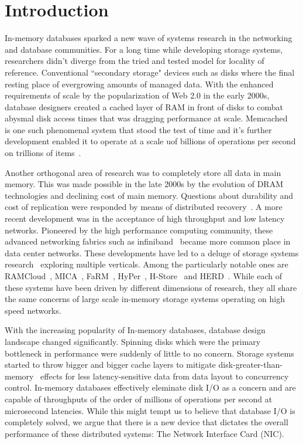 
\chapter{Introduction}
In-memory databases sparked a new wave of systems research in the 
networking and database communities. For a long time while developing storage
systems, researchers didn't diverge from the  tried and tested model for
locality of reference. Conventional ``secondary storage" devices
such as disks where the final resting place of evergrowing amounts of managed data. With the 
enhanced requirements of scale by the popularization of Web 2.0 in the early 2000s, 
database designers created a cached layer of RAM in front of disks
to combat abysmal disk access times that was dragging performance at scale. Memcached~\cite{memcached-orig}
is one such phenomenal system that stood the test of time and it's further development
enabled it to operate at a scale uof billions of operations per second on trillions of items~\cite{nishtala2013scaling}.

Another orthogonal area of research was to completely store all data in main memory.
This was made possible in the late 2000s by the evolution of DRAM technologies and declining cost of main memory.
Questions about durability and cost of replication 
were responded by means of distributed recovery~\cite{ongaro2011fast}. 
A more recent development was in the acceptance of high throughput and low latency networks. 
Pioneered by the high performance computing community, these advanced networking fabrics 
such as infiniband~\cite{pfister2001introduction} became more common place in 
data center networks. These developments have led to a deluge of storage systems research~\cite{mmdbmstutorial} 
exploring multiple verticals. Among the particularly notable ones are RAMCloud~\cite{ramcloud},
MICA~\cite{mica}, FaRM~\cite{farm}, HyPer~\cite{hyper}, H-Store~\cite{hstore} 
and HERD~\cite{herd}. While each of these systems have been driven by different dimensions 
of research, they all share the same concerns of large scale in-memory storage systems 
operating on high speed networks.


With the increasing popularity of In-memory databases, database design landscape changed significantly.
Spinning disks which were the primary bottleneck in performance were suddenly 
of little to no concern. Storage systems started to throw bigger and bigger cache layers to mitigate 
disk-greater-than-memory~\cite{couchbase} effects for less latency-sensitive data
from data layout to concurrency control. In-memory databases effectively eleminate disk I/O
as a concern and are capable of throughputs of the order of millions of operations per second
at microsecond latencies. While this might tempt us to believe that database I/O is completely
solved, we argue that there is a new device that dictates the overall performance of these 
distributed systems: The Network Interface Card (NIC).


